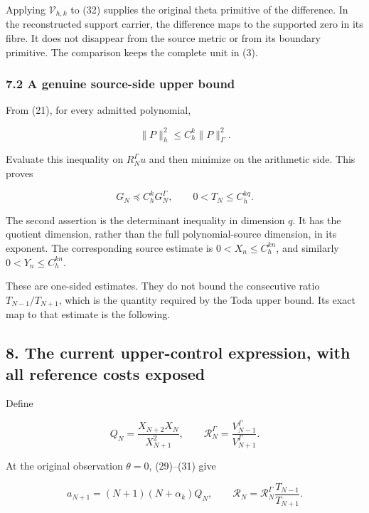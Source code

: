 Applying \(\mathcal V_{h,k}\) to (32) supplies the original theta primitive of the difference. In
the reconstructed support carrier, the difference maps to the supported zero in its fibre. It does
not disappear from the source metric or from its boundary primitive. The comparison keeps the
complete unit in (3).

\subsubsection{7.2 A genuine source-side upper bound}\label{gamma_convolution:a-genuine-source-side-upper-bound}

From (21), for every admitted polynomial,

\[
\|P\|_h^2\le C_h^k\|P\|_\Gamma^2.
\]

Evaluate this inequality on \(R_N^\Gamma u\) and then minimize on the arithmetic side. This proves

\[
\boxed{
G_N\preceq C_h^kG_N^\Gamma,\qquad
0<T_N\le C_h^{kq}.
}                                                                   \tag{33}
\]

The second assertion is the determinant inequality in dimension \(q\). It has the quotient
dimension, rather than the full polynomial-source dimension, in its exponent. The corresponding
source estimate is \(0<X_n\le C_h^{kn}\), and similarly \(0<Y_n\le C_h^{kn}\).

These are one-sided estimates. They do not bound the consecutive ratio \(T_{N-1}/T_{N+1}\), which is
the quantity required by the Toda upper bound. Its exact map to that estimate is the following.

\subsection{8. The current upper-control expression, with all reference costs
exposed}\label{gamma_convolution:the-current-upper-control-expression-with-all-reference-costs-exposed}

Define

\[
Q_N=\frac{X_{N+2}X_N}{X_{N+1}^2},\qquad
\mathcal R_N^\Gamma=\frac{V_{N-1}^\Gamma}{V_{N+1}^\Gamma}.
\]

At the original observation \(\theta=0\), (29)--(31) give

\[
\boxed{
a_{N+1}=(N+1)(N+\alpha_k)Q_N,\qquad
\mathcal R_N=\mathcal R_N^\Gamma\frac{T_{N-1}}{T_{N+1}}.
}                                                                   \tag{34}
\]

